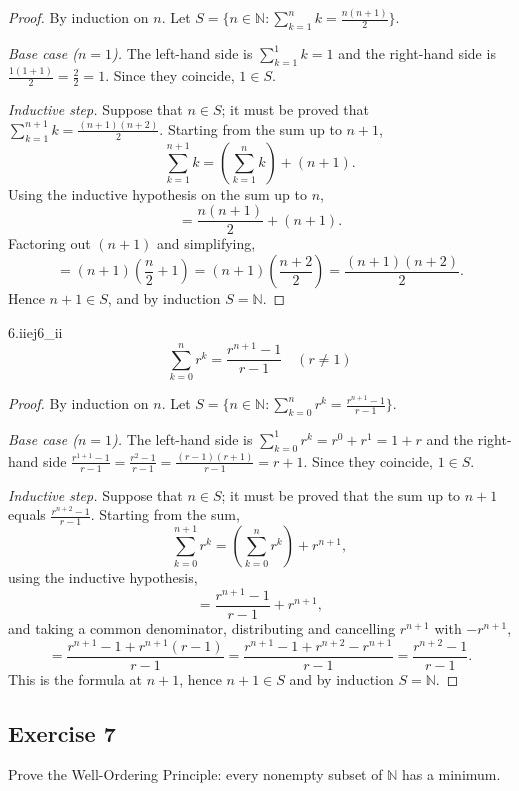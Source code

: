 \documentclass[11pt, a4paper]{article}
\begin{document}
\begin{proof}
By induction on $n$. Let $S = \{ n \in \mathbb{N} : \sum_{k=1}^{n}k=\frac{n(n+1)}{2} \}$.

\textit{Base case ($n=1$).} The left-hand side is $\sum_{k=1}^{1} k = 1$ and the right-hand side is
$\frac{1(1+1)}{2} = \frac{2}{2} = 1$. Since they coincide, $1 \in S$.

\textit{Inductive step.} Suppose that $n \in S$; it must be proved that
$\sum_{k=1}^{n+1}k = \frac{(n+1)(n+2)}{2}$. Starting from the sum up to $n+1$,
$$ \sum_{k=1}^{n+1}k = \left( \sum_{k=1}^{n}k \right) + (n+1). $$
Using the inductive hypothesis on the sum up to $n$,
$$ = \frac{n(n+1)}{2} + (n+1). $$
Factoring out $(n+1)$ and simplifying,
$$ = (n+1) \left( \frac{n}{2} + 1 \right) = (n+1) \left( \frac{n+2}{2} \right) = \frac{(n+1)(n+2)}{2}. $$
Hence $n+1 \in S$, and by induction $S = \mathbb{N}$.
\end{proof}

\begin{proposicion}{6.ii}{ej6_ii}
$$ \sum_{k=0}^{n}r^{k}=\frac{r^{n+1}-1}{r-1} \quad (r \neq 1) $$
\end{proposicion}

\begin{proof}
By induction on $n$. Let $S = \{ n \in \mathbb{N} : \sum_{k=0}^{n}r^{k}=\frac{r^{n+1}-1}{r-1} \}$.

\textit{Base case ($n=1$).} The left-hand side is $\sum_{k=0}^{1} r^k = r^0 + r^1 = 1 + r$ and the
right-hand side $\frac{r^{1+1}-1}{r-1} = \frac{r^2-1}{r-1} = \frac{(r-1)(r+1)}{r-1} = r+1$. Since they coincide,
$1 \in S$.

\textit{Inductive step.} Suppose that $n \in S$; it must be proved that the sum up to $n+1$ equals
$\frac{r^{n+2}-1}{r-1}$. Starting from the sum,
$$ \sum_{k=0}^{n+1} r^k = \left( \sum_{k=0}^{n} r^k \right) + r^{n+1}, $$
using the inductive hypothesis,
$$ = \frac{r^{n+1}-1}{r-1} + r^{n+1}, $$
and taking a common denominator, distributing and cancelling $r^{n+1}$ with $-r^{n+1}$,
$$ = \frac{r^{n+1}-1 + r^{n+1}(r-1)}{r-1} = \frac{r^{n+1} - 1 + r^{n+2} - r^{n+1}}{r-1}
= \frac{r^{n+2} - 1}{r-1}. $$
This is the formula at $n+1$, hence $n+1 \in S$ and by induction $S = \mathbb{N}$.
\end{proof}

\subsection*{Exercise 7}

Prove the Well-Ordering Principle: every nonempty subset of $\mathbb{N}$ has a minimum.
\end{document}

